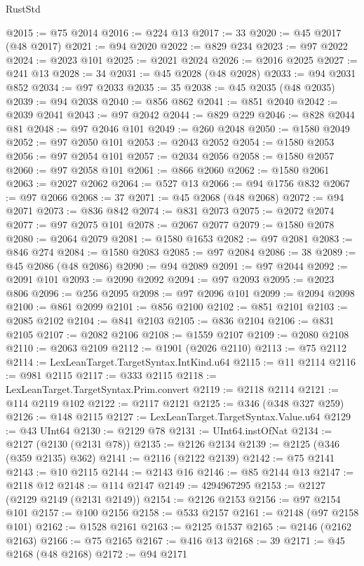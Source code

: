 \begin{lexlean}{RustStd}
\begin{coremodule}
@2015 := @75 @2014
@2016 := @224 @13
@2017 := 33
@2020 := @45 @2017 (@48 @2017)
@2021 := @94 @2020
@2022 := @829 @234
@2023 := @97 @2022
@2024 := @2023 @101
@2025 := @2021 @2024
@2026 := @2016 @2025
@2027 := @241 @13
@2028 := 34
@2031 := @45 @2028 (@48 @2028)
@2033 := @94 @2031 @852
@2034 := @97 @2033
@2035 := 35
@2038 := @45 @2035 (@48 @2035)
@2039 := @94 @2038
@2040 := @856 @862
@2041 := @851 @2040
@2042 := @2039 @2041
@2043 := @97 @2042
@2044 := @829 @229
@2046 := @828 @2044 @81
@2048 := @97 @2046 @101
@2049 := @260 @2048
@2050 := @1580 @2049
@2052 := @97 @2050 @101
@2053 := @2043 @2052
@2054 := @1580 @2053
@2056 := @97 @2054 @101
@2057 := @2034 @2056
@2058 := @1580 @2057
@2060 := @97 @2058 @101
@2061 := @866 @2060
@2062 := @1580 @2061
@2063 := @2027 @2062
@2064 := @527 @13
@2066 := @94 @1756 @832
@2067 := @97 @2066
@2068 := 37
@2071 := @45 @2068 (@48 @2068)
@2072 := @94 @2071
@2073 := @836 @842
@2074 := @831 @2073
@2075 := @2072 @2074
@2077 := @97 @2075 @101
@2078 := @2067 @2077
@2079 := @1580 @2078
@2080 := @2064 @2079
@2081 := @1580 @1653
@2082 := @97 @2081
@2083 := @846 @274
@2084 := @1580 @2083
@2085 := @97 @2084
@2086 := 38
@2089 := @45 @2086 (@48 @2086)
@2090 := @94 @2089
@2091 := @97 @2044
@2092 := @2091 @101
@2093 := @2090 @2092
@2094 := @97 @2093
@2095 := @2023 @806
@2096 := @256 @2095
@2098 := @97 @2096 @101
@2099 := @2094 @2098
@2100 := @861 @2099
@2101 := @856 @2100
@2102 := @851 @2101
@2103 := @2085 @2102
@2104 := @841 @2103
@2105 := @836 @2104
@2106 := @831 @2105
@2107 := @2082 @2106
@2108 := @1559 @2107
@2109 := @2080 @2108
@2110 := @2063 @2109
@2112 := @1901 (@2026 @2110)
@2113 := @75 @2112
@2114 := LexLeanTarget.TargetSyntax.IntKind.u64
@2115 := @11 @2114
@2116 := @981 @2115
@2117 := @333 @2115
@2118 := LexLeanTarget.TargetSyntax.Prim.convert
@2119 := @2118 @2114
@2121 := @114 @2119 @102
@2122 := @2117 @2121
@2125 := @346 (@348 @327 @259)
@2126 := @148 @2115
@2127 := LexLeanTarget.TargetSyntax.Value.u64
@2129 := @43 UInt64
@2130 := @2129 @78
@2131 := UInt64.instOfNat
@2134 := @2127 (@2130 (@2131 @78))
@2135 := @2126 @2134
@2139 := @2125 (@346 (@359 @2135) @362)
@2141 := @2116 (@2122 @2139)
@2142 := @75 @2141
@2143 := @10 @2115
@2144 := @2143 @16
@2146 := @85 @2144 @13
@2147 := @2118 @12
@2148 := @114 @2147
@2149 := 4294967295
@2153 := @2127 (@2129 @2149 (@2131 @2149))
@2154 := @2126 @2153
@2156 := @97 @2154 @101
@2157 := @100 @2156
@2158 := @533 @2157
@2161 := @2148 (@97 @2158 @101)
@2162 := @1528 @2161
@2163 := @2125 @1537
@2165 := @2146 (@2162 @2163)
@2166 := @75 @2165
@2167 := @416 @13
@2168 := 39
@2171 := @45 @2168 (@48 @2168)
@2172 := @94 @2171

\end{coremodule}
\end{lexlean}
